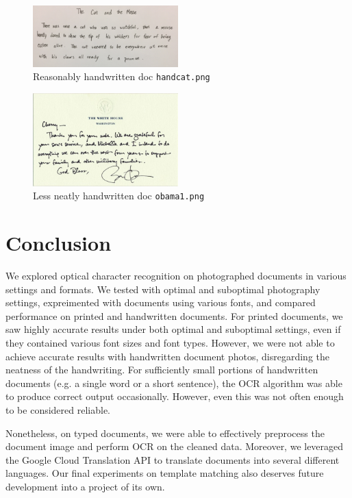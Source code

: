 \documentclass[11pt,letterpaper]{article}
\begin{document}
\begin{figure}[t!]
  \centering
  \includegraphics[keepaspectratio, width=0.5\textwidth]{cat.png}
  \caption{Reasonably handwritten doc {\tt hand\textunderscore cat.png}}
\end{figure}

\begin{figure}[t!]
  \centering
  \includegraphics[keepaspectratio, width=0.5\textwidth]{obama4.png}
  \caption{Less neatly handwritten doc {\tt obama1.png}}
\end{figure}


\section{Conclusion}

We explored optical character recognition on photographed documents in various settings and formats. We tested with optimal and suboptimal photography settings, expreimented with documents using various fonts, and compared performance on printed and handwritten documents. For printed documents, we saw highly accurate results under both optimal and suboptimal settings, even if they contained various font sizes and font types. However, we were not able to achieve accurate results with handwritten document photos, disregarding the neatness of the handwriting. For sufficiently small portions of handwritten documents (e.g. a single word or a short sentence), the OCR algorithm was able to produce correct output occasionally. However, even this was not often enough to be considered reliable. 

Nonetheless, on typed documents, we were able to effectively preprocess the document image and perform OCR on the cleaned data. Moreover, we leveraged the Google Cloud Translation API to translate documents into several different languages. Our final experiments on template matching also deserves future development into a project of its own.
\end{document}
